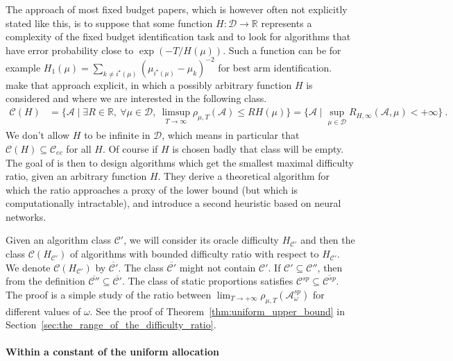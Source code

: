 \documentclass{article}
\begin{document}
The approach of most fixed budget papers, which is however often not explicitly stated like this, is to suppose that some function $H: \mathcal D \to \mathbb{R}$ represents a complexity of the fixed budget identification task and to look for algorithms that have error probability close to $\exp(-T/H(\mu))$. Such a function can be for example $H_1(\mu) = \sum_{k \ne i^\star(\mu)} (\mu_{i^\star(\mu)} - \mu_k)^{-2}$ for best arm identification.
\cite{komiyama2022minimax} make that approach explicit, in which a possibly arbitrary function $H$ is considered and where we are interested in the following class.
\begin{align*}
\mathcal C(H)
&= \{\mathcal A \mid \exists R \in \mathbb{R}, \: \forall \mu \in \mathcal D, \ \limsup_{T \to \infty}\rho_{\mu, T}(\mathcal A) \le R H(\mu)\}
= \{\mathcal A \mid \sup_{\mu \in \mathcal D} R_{H,\infty}(\mathcal A,\mu) < +\infty\}
\: .
\end{align*}
We don't allow $H$ to be infinite in $\mathcal D$, which means in particular that $\mathcal C(H) \subseteq \mathcal C_{ec}$ for all $H$.
Of course if $H$ is chosen badly that class will be empty.
The goal of \cite{komiyama2022minimax} is then to design algorithms which get the smallest maximal difficulty ratio, given an arbitrary function $H$.
They derive a theoretical algorithm for which the ratio approaches a proxy of the lower bound (but which is computationally intractable), and introduce a second heuristic based on neural networks.

Given an algorithm class $\mathcal C'$, we will consider its oracle difficulty $H_{\mathcal C'}$ and then the class $\mathcal C(H_{\mathcal C'})$ of algorithms with bounded difficulty ratio with respect to $H_{\mathcal C'}$. We denote $\mathcal C(H_{\mathcal C'})$ by $\overline{\mathcal C'}$.
The class $\overline{\mathcal C'}$ might not contain $\mathcal C'$. If $\mathcal C' \subseteq \mathcal C''$, then from the definition $\overline{\mathcal C''} \subseteq \overline{\mathcal C'}$.
The class of static proportions satisfies $\mathcal C^{sp} \subseteq \overline{\mathcal C^{sp}}$.
The proof is a simple study of the ratio between $\lim_{T \to + \infty} \rho_{\mu, T}(\mathcal A_\omega^{sp})$ for different values of $\omega$. See the proof of Theorem~\ref{thm:uniform_upper_bound} in Section~\ref{sec:the_range_of_the_difficulty_ratio}.

\paragraph{Within a constant of the uniform allocation}
\end{document}

